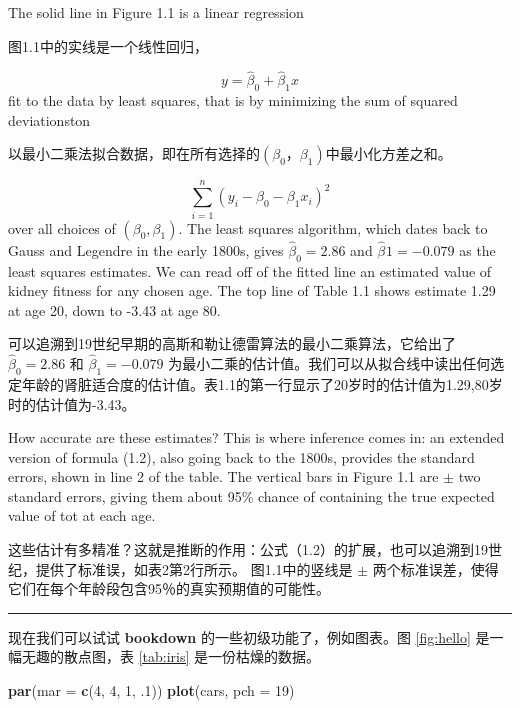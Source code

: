 \documentclass[]{ctexbook}
\newenvironment{Shaded}{\begin{snugshade}}{\end{snugshade}}
\newcommand{\DataTypeTok}[1]{\textcolor[rgb]{0.13,0.29,0.53}{#1}}
\newcommand{\DecValTok}[1]{\textcolor[rgb]{0.00,0.00,0.81}{#1}}
\newcommand{\FloatTok}[1]{\textcolor[rgb]{0.00,0.00,0.81}{#1}}
\newcommand{\KeywordTok}[1]{\textcolor[rgb]{0.13,0.29,0.53}{\textbf{#1}}}
\newcommand{\NormalTok}[1]{#1}
\theoremstyle{definition}
\theoremstyle{definition}
\theoremstyle{definition}
\theoremstyle{remark}
\begin{document}
The solid line in Figure 1.1 is a linear regression

图1.1中的实线是一个线性回归，

\[
y = \hat { \beta } _ { 0 } + \hat { \beta } _ { 1 } x
\] fit to the data by least squares, that is by minimizing the sum of
squared deviationston

以最小二乘法拟合数据，即在所有选择的\((\beta _ {0}， \beta _{1})\)中最小化方差之和。

\[
\sum _ { i = 1 } ^ { n } \left( y _ { i } - \beta _ { 0 } - \beta _ { 1 } x _ { i } \right) ^ { 2 }
\] over all choices of \(\left( \beta _ { 0 } , \beta _ { 1 } \right)\).
The least squares algorithm, which dates back to Gauss and Legendre in
the early 1800s, gives \(\hat { \beta } _ { 0 } = 2.86\) and
\(\hat { \beta } _ { }1 = -0.079\) as the least squares estimates. We
can read off of the fitted line an estimated value of kidney fitness for
any chosen age. The top line of Table 1.1 shows estimate 1.29 at age 20,
down to -3.43 at age 80.

可以追溯到19世纪早期的高斯和勒让德雷算法的最小二乘算法，它给出了\(\hat { \beta } _ { 0 } = 2.86\)
和 \(\hat { \beta } _ { 1 } = -0.079\)
为最小二乘的估计值。我们可以从拟合线中读出任何选定年龄的肾脏适合度的估计值。表1.1的第一行显示了20岁时的估计值为1.29,80岁时的估计值为-3.43。

How accurate are these estimates? This is where inference comes in: an
extended version of formula (1.2), also going back to the 1800s,
provides the standard errors, shown in line 2 of the table. The vertical
bars in Figure 1.1 are \(\pm\) two standard errors, giving them about
95\% chance of containing the true expected value of tot at each age.

这些估计有多精准？这就是推断的作用：公式（1.2）的扩展，也可以追溯到19世纪，提供了标准误，如表2第2行所示。
图1.1中的竖线是 \(\pm\)
两个标准误差，使得它们在每个年龄段包含95％的真实预期值的可能性。

\begin{center}\rule{0.5\linewidth}{\linethickness}\end{center}

现在我们可以试试 \textbf{bookdown} 的一些初级功能了，例如图表。图
\ref{fig:hello} 是一幅无趣的散点图，表 \ref{tab:iris} 是一份枯燥的数据。

\begin{Shaded}
\begin{Highlighting}[]
\KeywordTok{par}\NormalTok{(}\DataTypeTok{mar =} \KeywordTok{c}\NormalTok{(}\DecValTok{4}\NormalTok{, }\DecValTok{4}\NormalTok{, }\DecValTok{1}\NormalTok{, }\FloatTok{.1}\NormalTok{))}
\KeywordTok{plot}\NormalTok{(cars, }\DataTypeTok{pch =} \DecValTok{19}\NormalTok{)}
\end{Highlighting}
\end{Shaded}
\end{document}
